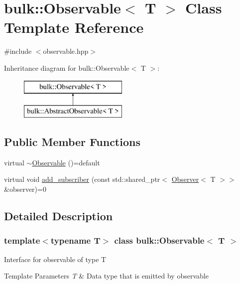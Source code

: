 \hypertarget{classbulk_1_1Observable}{}\section{bulk\+:\+:Observable$<$ T $>$ Class Template Reference}
\label{classbulk_1_1Observable}


{\ttfamily \#include $<$observable.\+hpp$>$}

Inheritance diagram for bulk\+:\+:Observable$<$ T $>$\+:\begin{figure}[H]
\begin{center}
\leavevmode
\includegraphics[height=2.000000cm]{classbulk_1_1Observable}
\end{center}
\end{figure}
\subsection*{Public Member Functions}
\begin{DoxyCompactItemize}
\item 
virtual \hyperlink{classbulk_1_1Observable_a4927059b909f8116927eb5275698153d}{$\sim$\+Observable} ()=default
\item 
virtual void \hyperlink{classbulk_1_1Observable_a1d014ef91398bff19bf96d9ef6bd5e10}{add\+\_\+subscriber} (const std\+::shared\+\_\+ptr$<$ \hyperlink{classbulk_1_1Observer}{Observer}$<$ T $>$$>$ \&observer)=0
\end{DoxyCompactItemize}


\subsection{Detailed Description}
\subsubsection*{template$<$typename T$>$\newline
class bulk\+::\+Observable$<$ T $>$}

Interface for observable of type T 
\begin{DoxyTemplParams}{Template Parameters}
{\em T} & Data type that is emitted by observable \\
\hline
\end{DoxyTemplParams}



